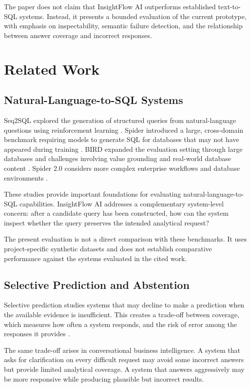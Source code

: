 \documentclass[conference]{IEEEtran}
\begin{document}
The paper does not claim that InsightFlow AI outperforms established text-to-SQL systems. Instead, it presents a bounded evaluation of the current prototype, with emphasis on inspectability, semantic failure detection, and the relationship between answer coverage and incorrect responses.

\section{Related Work}

\subsection{Natural-Language-to-SQL Systems}

Seq2SQL explored the generation of structured queries from natural-language questions using reinforcement learning \cite{zhong2017seq2sql}. Spider introduced a large, cross-domain benchmark requiring models to generate SQL for databases that may not have appeared during training \cite{yu2018spider}. BIRD expanded the evaluation setting through large databases and challenges involving value grounding and real-world database content \cite{li2023bird}. Spider 2.0 considers more complex enterprise workflows and database environments \cite{lei2025spider2}.

These studies provide important foundations for evaluating natural-language-to-SQL capabilities. InsightFlow AI addresses a complementary system-level concern: after a candidate query has been constructed, how can the system inspect whether the query preserves the intended analytical request?

The present evaluation is not a direct comparison with these benchmarks. It uses project-specific synthetic datasets and does not establish comparative performance against the systems evaluated in the cited work.

\subsection{Selective Prediction and Abstention}

Selective prediction studies systems that may decline to make a prediction when the available evidence is insufficient. This creates a trade-off between coverage, which measures how often a system responds, and the risk of error among the responses it provides \cite{geifman2017selective}.

The same trade-off arises in conversational business intelligence. A system that asks for clarification on every difficult request may avoid some incorrect answers but provide limited analytical coverage. A system that answers aggressively may be more responsive while producing plausible but incorrect results.
\end{document}
